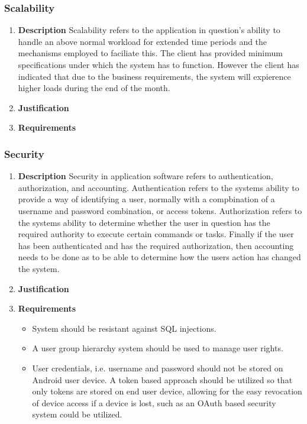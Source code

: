 \documentclass[a4paper,10pt]{article}
\begin{document}
\subsubsection{Scalability}
\begin{enumerate}
\item \textbf{Description}
Scalability refers to the application in question's ability to handle an above normal workload for extended time periods and the mechanisms employed to faciliate this.  The client has provided minimum specifications under which the system has to function. However the client has indicated that due to the business requirements, the system will expierence higher loads during the end of the month.
\item \textbf{Justification}
\item \textbf{Requirements}
\end{enumerate}

\subsubsection{Security}
\begin{enumerate}
\item \textbf{Description}
Security in application software refers to authentication, authorization, and accounting. Authentication refers to the systems ability to provide a way of identifying a user, normally with a compbination of a username and password combination, or access tokens. Authorization refers to the systems ability to determine whether the user in question has the required authority to execute certain commands or tasks. Finally if the user has been authenticated and has the required authorization, then accounting needs to be done as to be able to determine how the users action has changed the system.  
\item \textbf{Justification}
\item \textbf{Requirements}
	\begin{itemize}
	\item System should be resistant against SQL injections.
	\item A user group hierarchy system should be used to manage user rights.
	\item User credentials, i.e. username and password should not be stored on Android user device. A token based approach should be utilized so that only tokens are stored on end user device, allowing for the easy revocation of device access if a device is lost, such as an OAuth based security system could be utilized.
	\end{itemize}
\end{enumerate}
\end{document}
